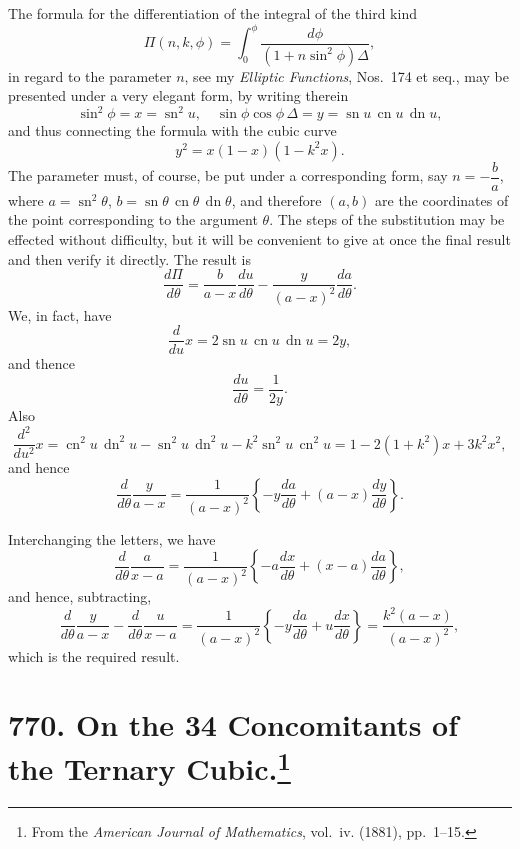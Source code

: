 \documentclass[11pt,a4paper]{book}
\begin{document}
The formula for the differentiation of the integral of the third kind
\[
\Pi(n, k, \phi) = \int_0^\phi \frac{d\phi}{(1 + n\sin^2\phi)\Delta},
\]
in regard to the parameter $n$, see my \textit{Elliptic Functions}, Nos.~174 et seq., may be presented under a very elegant form, by writing therein
\[
\sin^2\phi = x = \operatorname{sn}^2 u,\quad \sin\phi\cos\phi\,\Delta = y = \operatorname{sn}u\,\operatorname{cn}u\,\operatorname{dn}u,
\]
and thus connecting the formula with the cubic curve
\[
y^2 = x(1 - x)(1 - k^2x).
\]
The parameter must, of course, be put under a corresponding form, say $n = -\dfrac{b}{a}$, where $a = \operatorname{sn}^2\theta$, $b = \operatorname{sn}\theta\,\operatorname{cn}\theta\,\operatorname{dn}\theta$, and therefore $(a, b)$ are the coordinates of the point corresponding to the argument $\theta$. The steps of the substitution may be effected without difficulty, but it will be convenient to give at once the final result and then verify it directly. The result is
\[
\frac{d\Pi}{d\theta} = \frac{b}{a - x} \frac{du}{d\theta} - \frac{y}{(a - x)^2} \frac{da}{d\theta}.
\]
We, in fact, have
\[
\frac{d}{du} x = 2\operatorname{sn}u\,\operatorname{cn}u\,\operatorname{dn}u = 2y,
\]
and thence
\[
\frac{du}{d\theta} = \frac{1}{2y}.
\]
Also
\[
\frac{d^2}{du^2} x = \operatorname{cn}^2u\,\operatorname{dn}^2u - \operatorname{sn}^2u\,\operatorname{dn}^2u - k^2\operatorname{sn}^2u\,\operatorname{cn}^2u = 1 - 2(1 + k^2)x + 3k^2x^2,
\]
and hence
\[
\frac{d}{d\theta}\frac{y}{a - x} = \frac{1}{(a - x)^2}\left\{-y\frac{da}{d\theta} + (a - x)\frac{dy}{d\theta}\right\}.
\]

Interchanging the letters, we have
\[
\frac{d}{d\theta}\frac{a}{x - a} = \frac{1}{(a - x)^2}\left\{-a\frac{dx}{d\theta} + (x - a)\frac{da}{d\theta}\right\},
\]
and hence, subtracting,
\[
\frac{d}{d\theta}\frac{y}{a - x} - \frac{d}{d\theta}\frac{u}{x - a} = \frac{1}{(a - x)^2}\left\{-y\frac{da}{d\theta} + u\frac{dx}{d\theta}\right\} = \frac{k^2(a - x)}{(a - x)^2},
\]
which is the required result.

\newpage
\section[On the 34 Concomitants of the Ternary Cubic]{770. On the 34 Concomitants of the Ternary Cubic.\footnote{From the \textit{American Journal of Mathematics}, vol.~iv. (1881), pp.~1--15.}}
\end{document}
